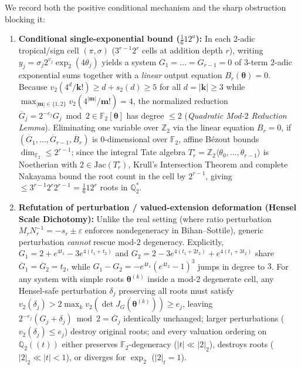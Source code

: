 \documentclass[11pt]{article}
\newcommand{\Z}{\mathbb{Z}}
\newcommand{\Q}{\mathbb{Q}}
\newcommand{\F}{\mathbb{F}}
\begin{document}
We record both the positive conditional mechanism and the sharp obstruction blocking it:
\begin{enumerate}[label=(\arabic*),leftmargin=1.8em]
  \item \textbf{Conditional single-exponential bound ($\frac{1}{6} 12^a$):} In each $2$-adic tropical/sign cell $(\pi, \sigma)$ ($3^{r-1} 2^r$ cells at addition depth $r$), writing $y_j = \sigma_j 2^{v_j} \exp_2(4\theta_j)$ yields a system $G_1 = \dots = G_{r-1} = 0$ of $3$-term $2$-adic exponential sums together with a \emph{linear} output equation $B_r(\boldsymbol{\theta}) = 0$. Because $v_2(4^d / \mathbf{k}!) \ge d + s_2(d) \ge 5$ for all $d = |\mathbf{k}| \ge 3$ while $\max_{|\mathbf{m}| \in \{1,2\}} v_2(4^{|\mathbf{m}|}/\mathbf{m}!) = 4$, the normalized reduction $\overline{G}_j = 2^{-e_j} G_j \bmod 2 \in \F_2[\boldsymbol{\theta}]$ has degree $\le 2$ (\emph{Quadratic Mod-$2$ Reduction Lemma}). Eliminating one variable over $\Z_2$ via the linear equation $B_r = 0$, if $(\overline{G}_1, \dots, \overline{G}_{r-1}, \overline{B}_r)$ is $0$-dimensional over $\F_2$, affine B\'ezout bounds $\dim_{\F_2} \le 2^{r-1}$; since the integral Tate algebra $T_r^\circ = \Z_2\langle \theta_0, \dots, \theta_{r-1} \rangle$ is Noetherian with $2 \in \mathrm{Jac}(T_r^\circ)$, Krull's Intersection Theorem and complete Nakayama bound the root count in the cell by $2^{r-1}$, giving $\le 3^{r-1} 2^r 2^{r-1} = \frac{1}{6} 12^r$ roots in $\Q_2^*$.
  \item \textbf{Refutation of perturbation / valued-extension deformation (Hensel Scale Dichotomy):} Unlike the real setting (where ratio perturbation $M_r N_r^{-1} = -s_r \pm \varepsilon$ enforces nondegeneracy in Bihan--Sottile), generic perturbation \emph{cannot} rescue mod-$2$ degeneracy. Explicitly, $G_1 = 2 + e^{4t_1} - 3 e^{4(t_1+t_2)}$ and $G_2 = 2 - 3 e^{4(t_1+2t_2)} + e^{4(t_1+3t_2)}$ share $\overline{G}_1 = \overline{G}_2 = t_2$, while $G_1 - G_2 = -e^{4t_1}(e^{4t_2} - 1)^3$ jumps in degree to $3$. For any system with simple roots $\boldsymbol{\theta}^{(k)}$ inside a mod-$2$ degenerate cell, any Hensel-safe perturbation $\delta_j$ preserving all roots must satisfy $v_2(\delta_j) > 2 \max_k v_2(\det J_G(\boldsymbol{\theta}^{(k)})) \ge e_j$, leaving $2^{-e_j}(G_j + \delta_j) \bmod 2 = \overline{G}_j$ identically unchanged; larger perturbations ($v_2(\delta_j) \le e_j$) destroy original roots; and every valuation ordering on $\Q_2(\!(t)\!)$ either preserves $\F_2$-degeneracy ($|t| \ll |2|_2$), destroys roots ($|2|_2 \ll |t| < 1$), or diverges for $\exp_2$ ($|2|_t = 1$).
\end{enumerate}
\end{document}
